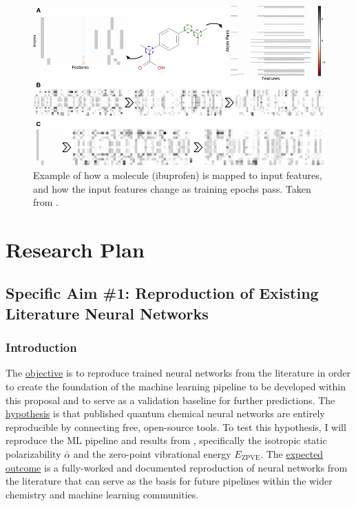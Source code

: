 \documentclass[12pt]{article}
\begin{document}
\begin{figure}[htbp]
\centering
\includegraphics[width=.9\linewidth]{10822_2016_9938_Fig8_HTML.png}
\caption{\label{fig:org63ccbb6}
Example of how a molecule (ibuprofen) is mapped to input features, and how the input features change as training epochs pass. Taken from \parencite{Kearnes2016}.}
\end{figure}

\section{Research Plan}
\label{sec:org2b702b1}

\subsection{Specific Aim \#1: Reproduction of Existing Literature Neural Networks}
\label{sec:orgf6cf272}

\subsubsection{Introduction}
\label{sec:orgd406537}

The \uline{objective} is to reproduce trained neural networks from the literature in order to create the foundation of the machine learning pipeline to be developed within this proposal and to serve as a validation baseline for further predictions. The \uline{hypothesis} is that published quantum chemical neural networks are entirely reproducible by connecting free, open-source tools. To test this hypothesis, I will reproduce the ML pipeline and results from \parencite{2017arXiv170205532F}, specifically the isotropic static polarizability \(\bar{\alpha}\) and the zero-point vibrational energy \(E_{\text{ZPVE}}\). The \uline{expected outcome} is a fully-worked and documented reproduction of neural networks from the literature that can serve as the basis for future pipelines within the wider chemistry and machine learning communities.
\end{document}
